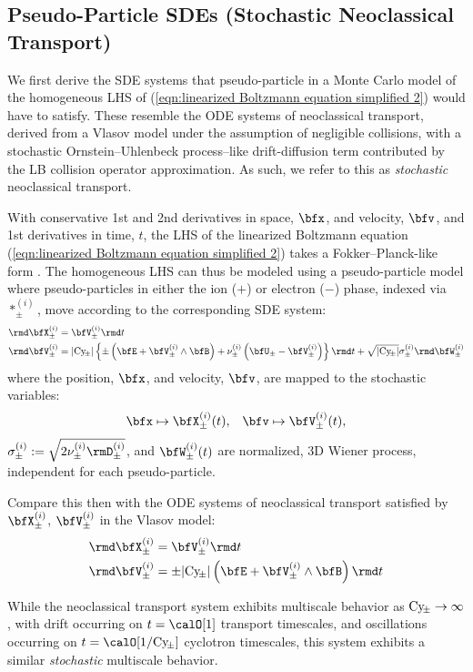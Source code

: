\subsection{Pseudo-Particle SDEs (Stochastic Neoclassical Transport)}
    We first derive the SDE systems that pseudo-particle in a Monte Carlo model of the homogeneous LHS of (\ref{eqn:linearized Boltzmann equation simplified 2}) would have to satisfy. These resemble the ODE systems of neoclassical transport, derived from a Vlasov model under the assumption of negligible collisions, with a stochastic Ornstein--Uhlenbeck process--like drift-diffusion term \cite{Gardiner_1985, Karatzas_Shreve_1991, Gard_1998} contributed by the LB collision operator approximation. As such, we refer to this as \emph{stochastic} neoclassical transport.
    
    With conservative 1st and 2nd derivatives in space, $\bfx$, and velocity, $\bfv$, and 1st derivatives in time, $t$, the LHS of the linearized Boltzmann equation (\ref{eqn:linearized Boltzmann equation simplified 2}) takes a Fokker--Planck-like form \cite{Fokker_1914, Planck_1917}. The homogeneous LHS can thus be modeled using a pseudo-particle model where pseudo-particles in either the ion ($+$) or electron ($-$) phase, indexed via $*_{\pm}^{(i)}$, move according to the corresponding SDE system:
    \begin{align}
        \rmd\bfX_{\pm}^{(i)}  &=  \bfV_{\pm}^{(i)}\rmd t  \label{eqn:stochastic neoclassical transport 1}  \\
        \rmd\bfV_{\pm}^{(i)}  &=  |\rmCy\!_{\pm}|\left\{\pm\left(\bfE + \bfV_{\pm}^{(i)}\wedge\bfB\right) + \nu_{\pm}^{(i)}\left(\bfU_{\pm} - \bfV_{\pm}^{(i)}\right)\right\}\rmd t + \sqrt{|\rmCy\!_{\pm}|}\sigma_{\pm}^{(i)}\rmd\bfW_{\pm}^{(i)}  \label{eqn:stochastic neoclassical transport 2}
    \end{align}
    where the position, $\bfx$, and velocity, $\bfv$, are mapped to the stochastic variables:
    \begin{align}
        \bfx  \mapsto  \bfX_{\pm}^{(i)}(t),  &&
        \bfv  \mapsto  \bfV_{\pm}^{(i)}(t),
    \end{align}
    $\sigma_{\pm}^{(i)}  :=  \sqrt{2\nu_{\pm}^{(i)}\rmD_{\pm}^{(i)}}$, and $\bfW_{\pm}^{(i)}(t)$ are normalized, 3D Wiener process, independent for each pseudo-particle.

    Compare this then with the ODE systems of neoclassical transport satisfied by $\bfX_{\pm}^{(i)}$, $\bfV_{\pm}^{(i)}$ in the Vlasov model:
    \begin{align}
        \rmd\bfX_{\pm}^{(i)}  &=  \bfV_{\pm}^{(i)}\rmd t  \label{eqn:deterministic neoclassical transport 1}  \\
        \rmd\bfV_{\pm}^{(i)}  &=  \pm|\rmCy\!_{\pm}|\left(\bfE + \bfV_{\pm}^{(i)}\wedge\bfB\right)\rmd t  \label{eqn:deterministic neoclassical transport 2}
    \end{align}
    
    While the neoclassical transport system exhibits multiscale behavior as $\mathrm{Cy}\!_{\pm} \rightarrow \infty$, with drift occurring on $t = \calO[1]$ transport timescales, and oscillations occurring on $t = \calO[1/\rmCy\!_{\pm}]$ cyclotron timescales, this system exhibits a similar \emph{stochastic} multiscale behavior.
